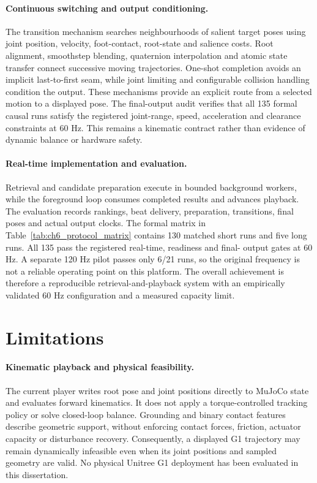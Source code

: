 \paragraph{Continuous switching and output conditioning.}
The transition mechanism searches neighbourhoods of salient target poses using
joint position, velocity, foot-contact, root-state and salience costs. Root
alignment, smoothstep blending, quaternion interpolation and atomic state
transfer connect successive moving trajectories. One-shot completion avoids
an implicit last-to-first seam, while joint limiting and configurable collision
handling condition the output. These mechanisms provide an explicit route from
a selected motion to a displayed pose. The final-output audit verifies that all
135 formal causal runs satisfy the registered joint-range, speed, acceleration
and clearance constraints at 60 Hz. This remains a kinematic contract rather
than evidence of dynamic balance or hardware safety.

\paragraph{Real-time implementation and evaluation.}
Retrieval and candidate preparation execute in bounded background workers,
while the foreground loop consumes completed results and advances playback.
The evaluation records rankings, beat delivery, preparation, transitions,
final poses and actual output clocks. The formal matrix in
Table~\ref{tab:ch6_protocol_matrix} contains 130 matched short runs and five
long runs. All 135 pass the registered real-time, readiness and final-
output gates at 60 Hz. A separate 120 Hz pilot passes only 6/21 runs, so the
original frequency is not a reliable operating point on this platform. The
overall achievement is therefore a reproducible retrieval-and-playback system
with an empirically validated 60 Hz configuration and a measured capacity limit.

\section{Limitations}
\label{sec:ch7_limitations}

\paragraph{Kinematic playback and physical feasibility.}
The current player writes root pose and joint positions directly to MuJoCo
state and evaluates forward kinematics. It does not apply a torque-controlled
tracking policy or solve closed-loop balance. Grounding and binary contact
features describe geometric support, without enforcing contact forces, friction,
actuator capacity or disturbance recovery. Consequently, a displayed G1
trajectory may remain dynamically infeasible even when its joint positions and
sampled geometry are valid. No physical Unitree G1 deployment has been evaluated
in this dissertation.

